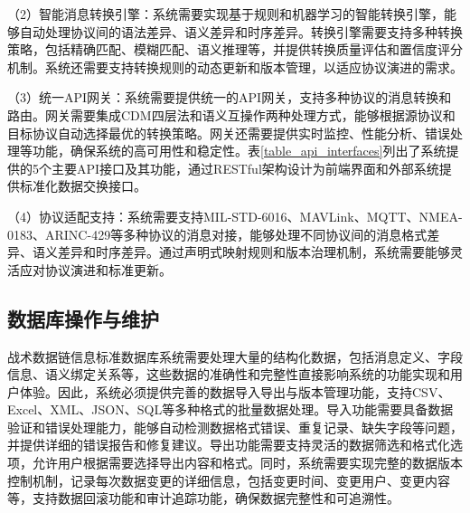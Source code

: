 （2）智能消息转换引擎：系统需要实现基于规则和机器学习的智能转换引擎，能够自动处理协议间的语法差异、语义差异和时序差异。转换引擎需要支持多种转换策略，包括精确匹配、模糊匹配、语义推理等，并提供转换质量评估和置信度评分机制。系统还需要支持转换规则的动态更新和版本管理，以适应协议演进的需求。

（3）统一API网关：系统需要提供统一的API网关，支持多种协议的消息转换和路由。网关需要集成CDM四层法和语义互操作两种处理方式，能够根据源协议和目标协议自动选择最优的转换策略。网关还需要提供实时监控、性能分析、错误处理等功能，确保系统的高可用性和稳定性。表\ref{table_api_interfaces}列出了系统提供的5个主要API接口及其功能，通过RESTful架构设计为前端界面和外部系统提供标准化数据交换接口。

\begin{table}[!htb]
    \caption{系统API接口功能表}
    \label{table_api_interfaces}
    \centering
\end{table}

（4）协议适配支持：系统需要支持MIL-STD-6016、MAVLink、MQTT、NMEA-0183、ARINC-429等多种协议的消息对接，能够处理不同协议间的消息格式差异、语义差异和时序差异。通过声明式映射规则和版本治理机制，系统需要能够灵活应对协议演进和标准更新。


\subsection{数据库操作与维护}
战术数据链信息标准数据库系统需要处理大量的结构化数据，包括消息定义、字段信息、语义绑定关系等，这些数据的准确性和完整性直接影响系统的功能实现和用户体验。因此，系统必须提供完善的数据导入导出与版本管理功能，支持CSV、Excel、XML、JSON、SQL等多种格式的批量数据处理。导入功能需要具备数据验证和错误处理能力，能够自动检测数据格式错误、重复记录、缺失字段等问题，并提供详细的错误报告和修复建议。导出功能需要支持灵活的数据筛选和格式化选项，允许用户根据需要选择导出内容和格式。同时，系统需要实现完整的数据版本控制机制，记录每次数据变更的详细信息，包括变更时间、变更用户、变更内容等，支持数据回滚功能和审计追踪功能，确保数据完整性和可追溯性。

